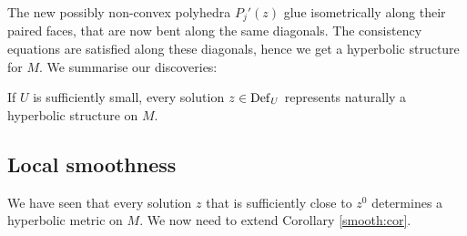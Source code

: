 The new possibly non-convex polyhedra $P_j'(z)$ glue isometrically along their paired faces, that are now bent along the same diagonals. The consistency equations are satisfied along these diagonals, hence we get a hyperbolic structure for $M$. We summarise our discoveries:

\begin{prop}
If $U$ is sufficiently small, every solution $z \in {\rm Def}_U$ represents naturally a hyperbolic structure on $M$.
\end{prop}

\subsection{Local smoothness}
We have seen that every solution $z$ that is sufficiently close to $z^0$ determines a hyperbolic metric on $M$. We now need to extend Corollary \ref{smooth:cor}. 

